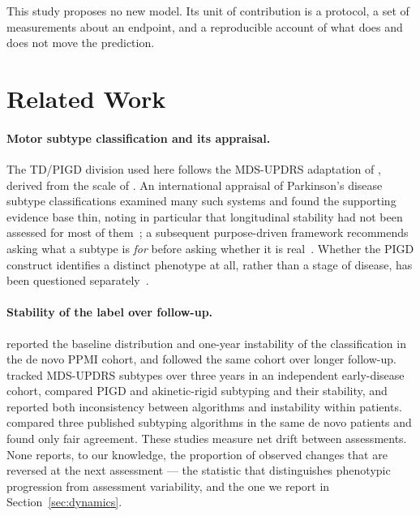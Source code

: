 \documentclass[11pt]{article}
\begin{document}
This study proposes no new model. Its unit of contribution is a protocol, a set
of measurements about an endpoint, and a reproducible account of what does and
does not move the prediction.

\section{Related Work}

\paragraph{Motor subtype classification and its appraisal.}
The TD/PIGD division used here follows the MDS-UPDRS adaptation of
\citet{stebbins2013}, derived from the scale of \citet{goetz2008}. An
international appraisal of Parkinson's disease subtype classifications examined
many such systems and found the supporting evidence base thin, noting in
particular that longitudinal stability had not been assessed for most of
them~\citep{mestre2021}; a subsequent purpose-driven framework recommends asking
what a subtype is \emph{for} before asking whether it is
real~\citep{marras2024}. Whether the PIGD construct identifies a distinct
phenotype at all, rather than a stage of disease, has been questioned
separately~\citep{nutt2016,kotagal2016,urso2022}.

\paragraph{Stability of the label over follow-up.}
\citet{simuni2016} reported the baseline distribution and one-year instability of
the classification in the de novo PPMI cohort, and \citet{lee2019} followed the
same cohort over longer follow-up. \citet{kohat2021} tracked MDS-UPDRS subtypes
over three years in an independent early-disease cohort, \citet{erro2019}
compared PIGD and akinetic-rigid subtyping and their stability, and
\citet{voncoelln2021} reported both inconsistency between algorithms and
instability within patients. \citet{ren2020,ren2021} compared three published
subtyping algorithms in the same de novo patients and found only fair agreement.
These studies measure net drift between assessments. None reports, to our
knowledge, the proportion of observed changes that are reversed at the next
assessment --- the statistic that distinguishes phenotypic progression from
assessment variability, and the one we report in Section~\ref{sec:dynamics}.
\end{document}
